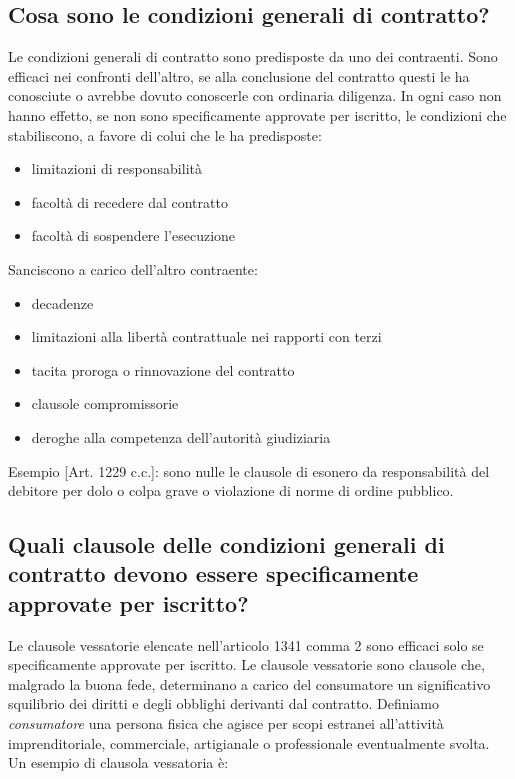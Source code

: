 \subsection{Cosa sono le condizioni generali di contratto?}
Le condizioni generali di contratto sono predisposte da uno dei contraenti. Sono efficaci nei confronti dell'altro, se
alla conclusione del contratto questi le ha conosciute o avrebbe dovuto conoscerle con ordinaria diligenza.
In ogni caso non hanno effetto, se non sono specificamente approvate per iscritto, le condizioni che stabiliscono,
a favore di colui che le ha predisposte:
\begin{itemize}
    \item limitazioni di responsabilità
    \item facoltà di recedere dal contratto
    \item facoltà di sospendere l'esecuzione
\end{itemize}
Sanciscono a carico dell'altro contraente:
\begin{itemize}
    \item decadenze
    \item limitazioni alla libertà contrattuale nei rapporti con terzi
    \item tacita proroga o rinnovazione del contratto
    \item clausole compromissorie
    \item deroghe alla competenza dell'autorità giudiziaria
\end{itemize}
Esempio [Art. 1229 c.c.]: sono nulle le clausole di esonero da responsabilità
del debitore per dolo o colpa grave o violazione di norme di ordine pubblico.

\subsection{Quali clausole delle condizioni generali di contratto devono essere specificamente approvate per iscritto?}
Le clausole vessatorie elencate nell'articolo 1341 comma 2 sono efficaci solo se specificamente
approvate per iscritto. Le clausole vessatorie sono clausole che, malgrado la buona fede,
determinano a carico del consumatore un significativo squilibrio dei diritti e degli obblighi derivanti
dal contratto.\newline
Definiamo \emph{consumatore} una persona fisica che agisce per scopi estranei all'attività imprenditoriale, commerciale,
artigianale o professionale eventualmente svolta.\newline
Un esempio di clausola vessatoria è: \newline \newline


